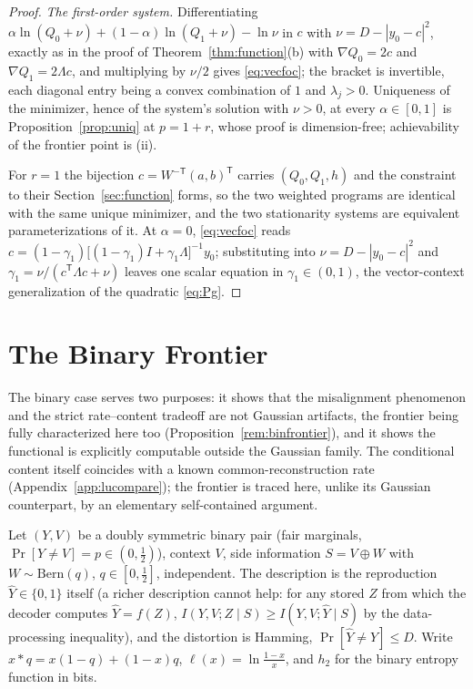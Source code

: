 \documentclass[11pt,onecolumn]{IEEEtran}
\newcommand{\hY}{\widehat{Y}}
\begin{document}
\begin{proof}
\emph{The first-order system.} Differentiating
$\alpha\ln(Q_0+\nu)+(1-\alpha)\ln(Q_1+\nu)-\ln\nu$ in $c$ with
$\nu=D-|y_0-c|^2$, exactly as in the proof of
Theorem~\ref{thm:function}(b) with $\nabla Q_0=2c$ and
$\nabla Q_1=2\Lambda c$, and multiplying by $\nu/2$ gives
\eqref{eq:vecfoc}; the bracket is invertible, each diagonal entry being
a convex combination of $1$ and $\lambda_j>0$. Uniqueness of the
minimizer, hence of the system's solution with $\nu>0$, at every
$\alpha\in[0,1]$ is Proposition~\ref{prop:uniq} at $p=1+r$, whose proof
is dimension-free; achievability of the frontier point is (ii).

For $r=1$ the bijection $c=W^{-\mathsf T}(a,b)^{\mathsf T}$ carries
$(Q_0,Q_1,h)$ and the constraint to their Section~\ref{sec:function}
forms, so the two weighted programs are identical with the same unique
minimizer, and the two stationarity systems are equivalent
parameterizations of it. At $\alpha=0$, \eqref{eq:vecfoc} reads
$c=(1-\gamma_1)\bigl[(1-\gamma_1)I+\gamma_1\Lambda\bigr]^{-1}y_0$;
substituting into $\nu=D-|y_0-c|^2$ and
$\gamma_1=\nu/(c^{\mathsf T}\Lambda c+\nu)$ leaves one scalar equation in
$\gamma_1\in(0,1)$, the vector-context generalization of the
quadratic \eqref{eq:Pg}.
\end{proof}

\section{The Binary Frontier}
\label{sec:binary}

The binary case serves two purposes: it shows that the
misalignment phenomenon and the strict rate--content tradeoff are not
Gaussian artifacts, the frontier being fully characterized here too
(Proposition~\ref{rem:binfrontier}), and it shows the functional is
explicitly computable outside the Gaussian family. The conditional
content itself coincides with a known common-reconstruction rate
(Appendix~\ref{app:lucompare}); the frontier is traced here, unlike its
Gaussian counterpart, by an elementary self-contained argument.

Let $(Y,V)$ be a doubly symmetric binary pair (fair marginals,
$\Pr[Y\ne V]=p\in(0,\tfrac12)$), context $V$, side information
$S=V\oplus W$ with $W\sim\mathrm{Bern}(q)$, $q\in[0,\tfrac12]$,
independent. The description is the reproduction $\hY\in\{0,1\}$ itself
(a richer description cannot help: for any stored $Z$ from which the
decoder computes $\hY=f(Z)$, $I(Y,V;Z\mid S)\ge I(Y,V;\hY\mid S)$
by the data-processing inequality), and the distortion is Hamming,
$\Pr[\hY\ne Y]\le D$. Write $x*q=x(1-q)+(1-x)q$,
$\ell(x)=\ln\frac{1-x}{x}$, and $h_2$ for the binary entropy function
in bits.
\end{document}
